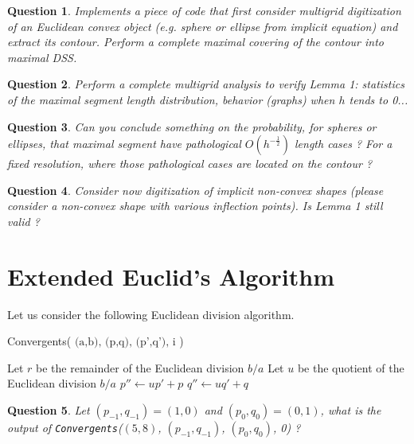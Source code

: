 \documentclass[a4paper, 11pt]{article}
\newtheorem{qu}{Question}
\begin{document}
\begin{qu}
  Implements a piece of code that first consider multigrid
  digitization of an Euclidean convex object (e.g. sphere or ellipse
  from implicit equation) and extract its contour. Perform a complete
  maximal covering of the contour into maximal DSS.
\end{qu}


\begin{qu}
  Perform a complete multigrid analysis to verify Lemma 1: statistics
  of the maximal segment length distribution, behavior (graphs) when
  $h$ tends to 0...
\end{qu}


\begin{qu}
  Can you conclude something on the probability, for spheres or
  ellipses,  that maximal segment have pathological
  $O(h^{-\frac{1}{2}})$ length cases ? For a fixed resolution, where
  those pathological cases are located on the contour ?
\end{qu}


\begin{qu}
  Consider now digitization of implicit non-convex shapes (please
  consider a non-convex shape with various inflection points). Is
  Lemma 1 still valid ?
\end{qu}



\section{Extended Euclid's Algorithm}

Let us consider the following Euclidean division algorithm.

\begin{procedure}[H]
\caption{Convergents( $\text{(a,b), (p,q), (p',q'), i}$ )}
\label{algo:conv}
%
Let $r$ be the remainder of the Euclidean division $b/a$\;
Let $u$ be the quotient  of the Euclidean division $b/a$\;
$p'' \leftarrow up' + p$\; $q'' \leftarrow uq' + q$\;
\end{procedure}


\begin{qu}
\label{qu:init}
  Let $(p_{-1},q_{-1})=(1,0)$ and $(p_0,q_0)=(0,1)$, what is the
  output of \emph{\texttt{Convergents}}($(5,8)$, $(p_{-1},q_{-1})$,
  $(p_0,q_0)$, 0) ?
\end{qu}
\end{document}
